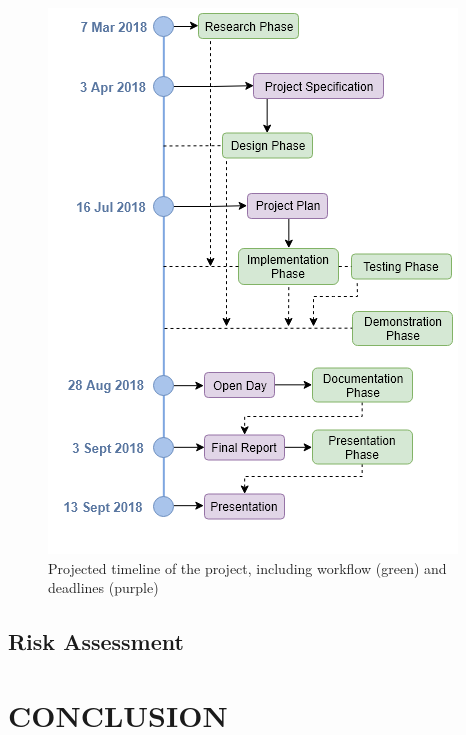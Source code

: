 \documentclass[10pt,twocolumn]{witseiepaper}
\begin{document}
	\begin{figure}
		\centering
		\includegraphics[width=1\columnwidth]{media/timeline.png}
		\caption{Projected timeline of the project, including workflow (green) and deadlines (purple)}
		\raggedright
		\label{fig:timeline}
	\end{figure}
	
	
	\subsection{Risk Assessment}

\section{CONCLUSION}

{}


\clearpage
\onecolumn
\appendix
\end{document}

